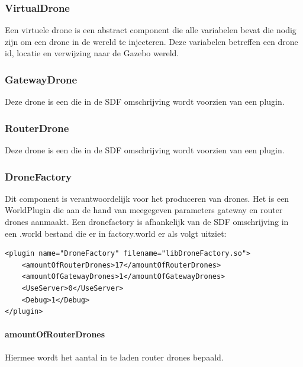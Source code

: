 \documentclass[a4paper, 11pt, oneside]{report}
\begin{document}
\subsubsection{VirtualDrone}
\label{architectural:subcomponenten:VirtualDrone}
Een virtuele drone is een abstract component die alle variabelen bevat die nodig zijn om een drone in de wereld te injecteren. Deze variabelen betreffen een drone id, locatie en verwijzing naar de Gazebo wereld. 

\subsubsection{GatewayDrone}
\label{architectural:subcomponenten:GatewayDrone}
Deze drone is een  die in de SDF omschrijving wordt voorzien van een  plugin. 
\subsubsection{RouterDrone}
\label{architectural:subcomponenten:RouterDrone}
Deze drone is een  die in de SDF omschrijving wordt voorzien van een  plugin. 

\subsubsection{DroneFactory}
\label{architectural:subcomponenten:DroneFactory}
Dit component is verantwoordelijk voor het produceren van drones. Het is een WorldPlugin die aan de hand van meegegeven parameters gateway en router drones aanmaakt. Een dronefactory is afhankelijk van de SDF omschrijving in een .world bestand die er in factory.world er als volgt uitziet:

\begin{lstlisting}
<plugin name="DroneFactory" filename="libDroneFactory.so">
	<amountOfRouterDrones>17</amountOfRouterDrones>
	<amountOfGatewayDrones>1</amountOfGatewayDrones>
	<UseServer>0</UseServer>
	<Debug>1</Debug>
</plugin>
\end{lstlisting}

\paragraph{amountOfRouterDrones} Hiermee wordt het aantal in te laden router drones bepaald.
 
\end{document}
